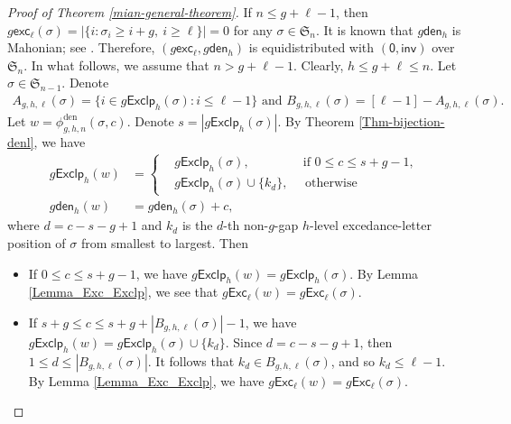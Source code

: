 \documentclass[12pt]{article}
\begin{document}
\begin{proof}[Proof of Theorem \ref{mian-general-theorem}]
	If $n\leq g+\ell-1$, 
	then $g\textsf{exc}_{\ell}(\sigma)=|\{i:\sigma_{i}\geq i+g,\!~i\geq \ell\}|=0$ for any $\sigma\in\mathfrak{S}_{n}$.
	It is known that $g\textsf{den}_{h}$ is Mahonian; see \cite[the paragraph preceding Section 3]{Liu-2024}.
	Therefore, $(g\textsf{exc}_{\ell},g\textsf{den}_{h})$ is equidistributed with $(\textsf{0},\textsf{inv})$ over $\mathfrak{S}_{n}$.
	In what follows, we assume that $n>g+\ell-1$.
	Clearly, $h\leq g+\ell\leq n$.
	Let $\sigma\in\mathfrak{S}_{n-1}$.	
	Denote 
    \begin{align*}
	A_{g,h,\ell}(\sigma)=\{i\in g\textsf{Exclp}_{h}(\sigma):i\leq \ell-1\}
	\text{~and~}
	B_{g,h,\ell}(\sigma)=[\ell-1]-A_{g,h,\ell}(\sigma).
    \end{align*}
	Let $w=\phi_{g,h,n}^{\text{den}}(\sigma,c)$. Denote $s=|g\textsf{Exclp}_{h}(\sigma)|$.
	By Theorem \ref{Thm-bijection-denl}, we have
	\begin{align*}
		g\textsf{Exclp}_{h}(w)&=
		\left\{
		\begin{aligned}
			&g\textsf{Exclp}_{h}(\sigma), \quad\quad\quad\quad~\text{if~}0\leq c\leq s+g-1,\\
			&g\textsf{Exclp}_{h}(\sigma)\cup\{k_{d}\},\quad\text{~otherwise}
		\end{aligned}
		\right. \\
		g\textsf{den}_{h}(w)&=g\textsf{den}_{h}(\sigma)+c, 
	\end{align*}
	where  $d=c-s-g+1$ and $k_{d}$ is the $d$-th non-$g$-gap $h$-level excedance-letter position of $\sigma$ from smallest to largest. Then
	\begin{itemize}
		\item[$\bullet$] If $0\leq c\leq s+g-1$, we have
		$g\textsf{Exclp}_{h}(w)=g\textsf{Exclp}_{h}(\sigma)$.
		By Lemma \ref{Lemma_Exc_Exclp}, we see that $g\textsf{Exc}_{\ell}(w)=g\textsf{Exc}_{\ell}(\sigma)$.
		
		\item[$\bullet$] If $s+g\leq c\leq s+g+|B_{g,h,\ell}(\sigma)|-1$,
		we have $g\textsf{Exclp}_{h}(w)=g\textsf{Exclp}_{h}(\sigma)\cup\{k_{d}\}$.
		Since $d=c-s-g+1$, then $1\leq d\leq |B_{g,h,\ell}(\sigma)|$.
		It follows that $k_{d}\in B_{g,h,\ell}(\sigma)$, and so $k_{d}\leq \ell-1$.
		By Lemma \ref{Lemma_Exc_Exclp}, we have $g\textsf{Exc}_{\ell}(w)=g\textsf{Exc}_{\ell}(\sigma)$.
		

\end{itemize}
\end{proof}
\end{document}
